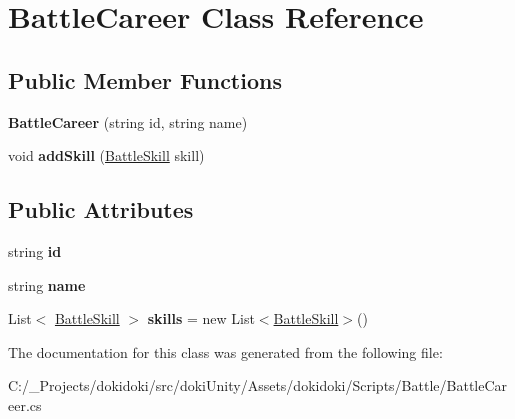 \hypertarget{class_battle_career}{}\section{Battle\+Career Class Reference}
\label{class_battle_career}
\subsection*{Public Member Functions}
\begin{DoxyCompactItemize}
\item 
{\bfseries Battle\+Career} (string id, string name)\hypertarget{class_battle_career_ab064d3cef9d871700bb49a5d7eb765e7}{}\label{class_battle_career_ab064d3cef9d871700bb49a5d7eb765e7}

\item 
void {\bfseries add\+Skill} (\hyperlink{class_battle_skill}{Battle\+Skill} skill)\hypertarget{class_battle_career_a902780d1ce55a1f864e9611129c41047}{}\label{class_battle_career_a902780d1ce55a1f864e9611129c41047}

\end{DoxyCompactItemize}
\subsection*{Public Attributes}
\begin{DoxyCompactItemize}
\item 
string {\bfseries id}\hypertarget{class_battle_career_a76d69995fb0570ce7bd8e1e262a49be6}{}\label{class_battle_career_a76d69995fb0570ce7bd8e1e262a49be6}

\item 
string {\bfseries name}\hypertarget{class_battle_career_afb5c67400b8589d8da9846cdeb565163}{}\label{class_battle_career_afb5c67400b8589d8da9846cdeb565163}

\item 
List$<$ \hyperlink{class_battle_skill}{Battle\+Skill} $>$ {\bfseries skills} = new List$<$\hyperlink{class_battle_skill}{Battle\+Skill}$>$()\hypertarget{class_battle_career_a7927a60ac5e26b42c00c9890adae9a15}{}\label{class_battle_career_a7927a60ac5e26b42c00c9890adae9a15}

\end{DoxyCompactItemize}


The documentation for this class was generated from the following file\+:\begin{DoxyCompactItemize}
\item 
C\+:/\+\_\+\+Projects/dokidoki/src/doki\+Unity/\+Assets/dokidoki/\+Scripts/\+Battle/Battle\+Career.\+cs\end{DoxyCompactItemize}
